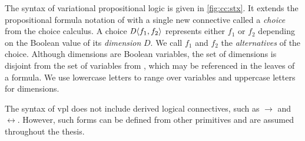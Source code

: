 \label{section:vpl:syntax}
%
The syntax of variational propositional logic is given in
\autoref{fig:cc:stx}. It extends the propositional formula notation of \pl{}
with a single new connective called a \emph{choice} from the choice calculus.
%
A choice $\chc[D]{f_1,f_2}$ represents either $f_1$ or $f_2$ depending on the
Boolean value of its \emph{dimension} $D$. We call $f_1$ and $f_2$ the
\emph{alternatives} of the choice.
%
Although dimensions are Boolean variables, the set of dimensions is disjoint
from the set of variables from \pl{}, which may be referenced in the leaves of
a formula. We use lowercase letters to range over variables and uppercase
letters for dimensions.

The syntax of \ac{vpl} does not include derived logical connectives, such as
$\rightarrow$ and $\leftrightarrow$. However, such forms can be defined
from other primitives and are assumed throughout the thesis.


